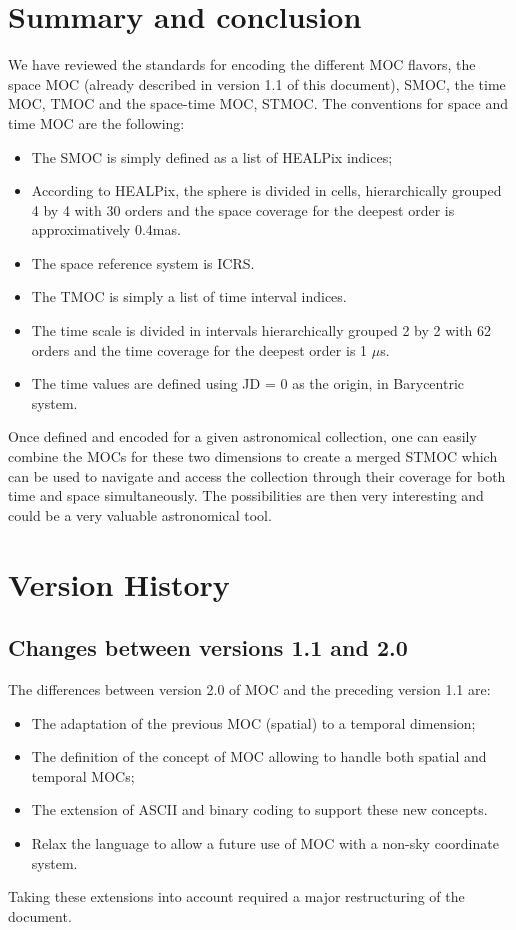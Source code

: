 \documentclass[11pt,a4paper]{ivoa}
\begin{document}
\section{Summary and conclusion}
We have reviewed the standards for encoding the different MOC flavors,
the space MOC (already described in version 1.1 of this document),
SMOC, the time MOC, TMOC and the space-time MOC, STMOC. 
The conventions for space and time MOC are the following:
\begin{itemize}
\item The SMOC is simply defined as a list of HEALPix indices;
\item According to HEALPix, the sphere is divided in cells,
  hierarchically grouped 4 by 4 with 30 orders and the space coverage
  for the deepest order is approximatively 0.4mas.
\item The space reference system is ICRS. 
\item The TMOC is simply a list of time interval indices.
\item The time scale is divided in intervals hierarchically grouped 2 by
  2 with 62 orders and the time coverage for the deepest order is 1 $\mu$s. 
\item The time values are defined using JD = 0 as the origin, in Barycentric system. 
\end{itemize}

Once defined and encoded for a given astronomical collection, one
can easily combine the MOCs for these two dimensions to create a
merged STMOC which can be used to navigate and access the collection
through their coverage for both time and space simultaneously.
The possibilities are then very interesting and could be a very
valuable astronomical tool.




\appendix
\section{Version History}

\subsection{Changes between versions 1.1 and 2.0}

The differences between version 2.0 of MOC and the preceding version 1.1 are:
\begin{itemize}
   \item The adaptation of the previous MOC (spatial) to a temporal
     dimension;
   \item The definition of the concept of MOC allowing to handle both
     spatial and temporal MOCs;
   \item The extension of ASCII and binary coding to support these new
     concepts.
    \item Relax the language to allow a future use of MOC with a non-sky coordinate system. 
\end{itemize}
Taking these extensions into account required a major restructuring of
the document.
\end{document}
